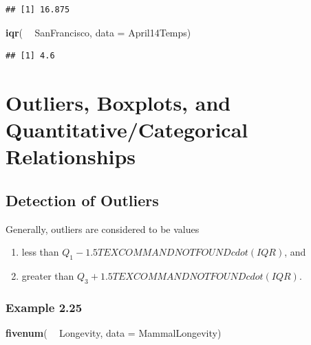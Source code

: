 \documentclass[]{book}
\newenvironment{Shaded}{\begin{snugshade}}{\end{snugshade}}
\newcommand{\DataTypeTok}[1]{\textcolor[rgb]{0.13,0.29,0.53}{#1}}
\newcommand{\KeywordTok}[1]{\textcolor[rgb]{0.13,0.29,0.53}{\textbf{#1}}}
\newcommand{\NormalTok}[1]{#1}
\newcommand{\OperatorTok}[1]{\textcolor[rgb]{0.81,0.36,0.00}{\textbf{#1}}}
\newcommand{\StringTok}[1]{\textcolor[rgb]{0.31,0.60,0.02}{#1}}
\providecommand{\tightlist}{%
  \setlength{\itemsep}{0pt}\setlength{\parskip}{0pt}}
\begin{document}
\begin{verbatim}
## [1] 16.875
\end{verbatim}

\begin{Shaded}
\begin{Highlighting}[]
\KeywordTok{iqr}\NormalTok{( }\OperatorTok{~}\StringTok{ }\NormalTok{SanFrancisco, }\DataTypeTok{data =}\NormalTok{ April14Temps)}
\end{Highlighting}
\end{Shaded}

\begin{verbatim}
## [1] 4.6
\end{verbatim}

\hypertarget{outliers-boxplots-and-quantitativecategorical-relationships}{%
\section{Outliers, Boxplots, and Quantitative/Categorical Relationships}\label{outliers-boxplots-and-quantitativecategorical-relationships}}

\hypertarget{detection-of-outliers}{%
\subsection{Detection of Outliers}\label{detection-of-outliers}}

Generally, outliers are considered to be values

\begin{enumerate}
\tightlist
\item
  less than \(Q_1 - 1.5 TEX COMMAND NOT FOUND cdot (IQR)\), and
\item
  greater than \(Q_3 + 1.5 TEX COMMAND NOT FOUND cdot (IQR)\).\\
\end{enumerate}

\hypertarget{example-2.25}{%
\subsubsection{Example 2.25}\label{example-2.25}}

\begin{Shaded}
\begin{Highlighting}[]
\KeywordTok{fivenum}\NormalTok{( }\OperatorTok{~}\StringTok{ }\NormalTok{Longevity, }\DataTypeTok{data =}\NormalTok{ MammalLongevity)}
\end{Highlighting}
\end{Shaded}
\end{document}

